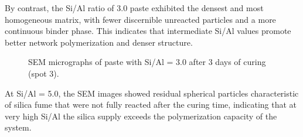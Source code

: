 By contrast, the Si/Al ratio of 3.0 paste exhibited the densest and most homogeneous matrix, with fewer discernible unreacted particles and a more continuous binder phase.
This indicates that intermediate Si/Al values promote better network polymerization and denser structure.

\begin{figure}[H]
  \centering
  \caption{SEM micrographs of paste with Si/Al = 3.0 after 3 days of curing (spot 3).}
  \label{fig:si_al_3-0_spot3_sem}
\end{figure}

At Si/Al = 5.0, the SEM images showed residual spherical particles characteristic of silica fume that were not fully reacted after the curing time, indicating that at very high Si/Al the silica supply exceeds the polymerization capacity of the system.


